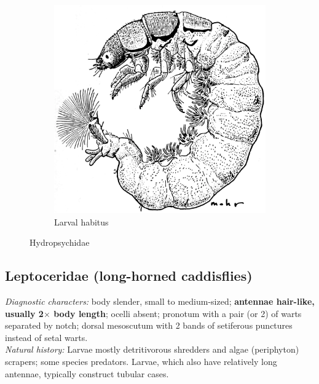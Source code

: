 \documentclass[letterpaper, 11pt]{article}
\begin{document}
\begin{figure}[ht!]
\begin{subfigure}[ht!]{0.4\textwidth}
        \includegraphics[width=\textwidth]{HydropsychidLarva}%
        \caption{Larval habitus \citep[][Fig. 281]{bhl50956}}
        \label{fig:hydropsychid2}
    \end{subfigure}
    \caption{Hydropsychidae}\label{fig:hydropsychids}
\end{figure}

\subsection{Leptoceridae (long-horned caddisflies)}%
\noindent{}\textit{Diagnostic characters:} body slender, small to medium-sized; \textbf{antennae hair-like, usually 2$\times$ body length}; ocelli absent; pronotum with a pair (or 2) of warts separated by notch; dorsal mesoscutum with 2 bands of setiferous punctures instead of setal warts.\\

\noindent{}\textit{Natural history:} Larvae mostly detritivorous shredders and algae (periphyton) scrapers; some species predators. Larvae, which also have relatively long antennae, typically construct tubular cases.
\end{document}
